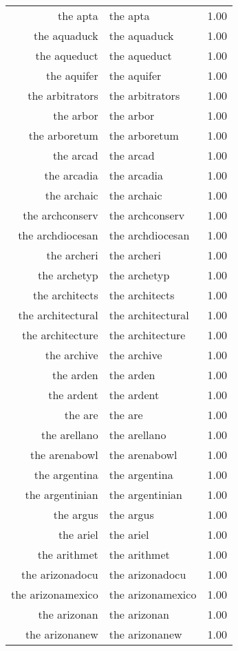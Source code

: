 \begin{table}[ht]
\begin{tabular}{rlr}
  the apta & the apta & 1.00 \\ 
  the aquaduck & the aquaduck & 1.00 \\ 
  the aqueduct & the aqueduct & 1.00 \\ 
  the aquifer & the aquifer & 1.00 \\ 
  the arbitrators & the arbitrators & 1.00 \\ 
  the arbor & the arbor & 1.00 \\ 
  the arboretum & the arboretum & 1.00 \\ 
  the arcad & the arcad & 1.00 \\ 
  the arcadia & the arcadia & 1.00 \\ 
  the archaic & the archaic & 1.00 \\ 
  the archconserv & the archconserv & 1.00 \\ 
  the archdiocesan & the archdiocesan & 1.00 \\ 
  the archeri & the archeri & 1.00 \\ 
  the archetyp & the archetyp & 1.00 \\ 
  the architects & the architects & 1.00 \\ 
  the architectural & the architectural & 1.00 \\ 
  the architecture & the architecture & 1.00 \\ 
  the archive & the archive & 1.00 \\ 
  the arden & the arden & 1.00 \\ 
  the ardent & the ardent & 1.00 \\ 
  the are & the are & 1.00 \\ 
  the arellano & the arellano & 1.00 \\ 
  the arenabowl & the arenabowl & 1.00 \\ 
  the argentina & the argentina & 1.00 \\ 
  the argentinian & the argentinian & 1.00 \\ 
  the argus & the argus & 1.00 \\ 
  the ariel & the ariel & 1.00 \\ 
  the arithmet & the arithmet & 1.00 \\ 
  the arizonadocu & the arizonadocu & 1.00 \\ 
  the arizonamexico & the arizonamexico & 1.00 \\ 
  the arizonan & the arizonan & 1.00 \\ 
  the arizonanew & the arizonanew & 1.00 \\ 

\end{tabular}
\end{table}
